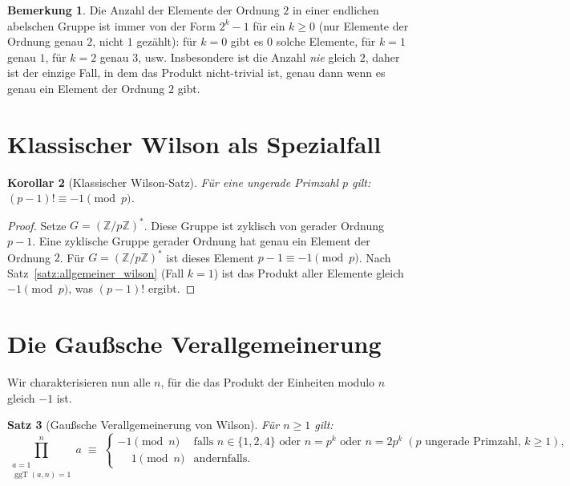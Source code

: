 \documentclass[12pt,a4paper]{amsart}
\newtheorem{theorem}{Satz}[section]
\newtheorem{korollar}[theorem]{Korollar}
\theoremstyle{definition}
\newtheorem{bemerkung}[theorem]{Bemerkung}
\newcommand{\Z}{\mathbb{Z}}
\DeclareMathOperator{\ggT}{ggT}
\begin{document}
\begin{bemerkung}
  Die Anzahl der Elemente der Ordnung $2$ in einer endlichen abelschen Gruppe
  ist immer von der Form $2^k - 1$ für ein $k \geq 0$ (nur Elemente der Ordnung
  genau $2$, nicht $1$ gezählt): für $k=0$ gibt es $0$ solche Elemente,
  für $k=1$ genau $1$, für $k=2$ genau $3$, usw. Insbesondere ist die Anzahl
  \emph{nie} gleich $2$, daher ist der einzige Fall, in dem das Produkt
  nicht-trivial ist, genau dann wenn es genau ein Element der Ordnung $2$ gibt.
\end{bemerkung}

\section{Klassischer Wilson als Spezialfall}

\begin{korollar}[Klassischer Wilson-Satz]\label{kor:klassischer_wilson}
  Für eine ungerade Primzahl $p$ gilt: $(p-1)! \equiv -1 \pmod{p}$.
\end{korollar}

\begin{proof}
  Setze $G = (\Z/p\Z)^*$. Diese Gruppe ist zyklisch von gerader Ordnung $p-1$.
  Eine zyklische Gruppe gerader Ordnung hat genau ein Element der Ordnung $2$.
  Für $G = (\Z/p\Z)^*$ ist dieses Element $p-1 \equiv -1 \pmod{p}$.
  Nach Satz~\ref{satz:allgemeiner_wilson} (Fall $k=1$) ist das Produkt aller
  Elemente gleich $-1 \pmod{p}$, was $(p-1)!$ ergibt.
\end{proof}

\section{Die Gaußsche Verallgemeinerung}

Wir charakterisieren nun alle $n$, für die das Produkt der Einheiten modulo $n$
gleich $-1$ ist.

\begin{theorem}[Gaußsche Verallgemeinerung von Wilson]\label{satz:gauss}
  Für $n \geq 1$ gilt:
  \[
    \prod_{\substack{a=1\\\ggT(a,n)=1}}^{n} a
    \;\equiv\;
    \begin{cases}
      -1 \pmod{n} & \text{falls } n \in \{1, 2, 4\}
                    \text{ oder } n = p^k \text{ oder } n = 2p^k
                    \;(p \text{ ungerade Primzahl, } k \geq 1),\\
      \phantom{-}1 \pmod{n} & \text{andernfalls.}
    \end{cases}
  \]
\end{theorem}
\end{document}
